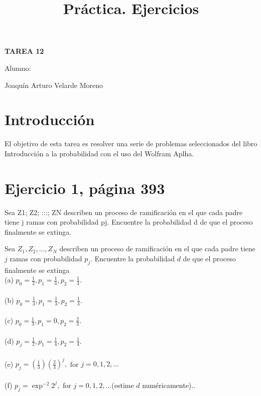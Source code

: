 \documentclass[]{article}
\title{Práctica. Ejercicios}
\date{}
\begin{document}
	\maketitle
	\begin{center}


\centerline{\textbf{TAREA 12} } 
\textbf{ }

\centerline{Alumno: } 
\centerline{Joaquín Arturo Velarde Moreno}


	\end{center}
	

\section{Introducción}

El objetivo de esta tarea es resolver una serie de problemas seleccionados del libro Introducción a la probabilidad\cite{Material} con el uso del Wolfram Aplha\cite{wolf}.

\section{Ejercicio 1, página 393}

Sea Z1; Z2; :::; ZN describen un proceso de ramificación en el que cada padre tiene j ramas con probabilidad pj.
Encuentre la probabilidad d de que el proceso finalmente se extinga.

Sea $Z_{1}, Z_{2}, ..., Z_{N}$ describen un proceso de ramificación en el que cada padre tiene  $j$ ramas con probabilidad $p_{j}$. Encuentre la probabilidad  $d$ de que el proceso finalmente se extinga
\\
(a) $p_{0} = \frac{1}{2}, p_{1} = \frac{1}{4}, p_{2} = \frac{1}{4}$.\\
\\
(b) $p_{0} = \frac{1}{3}, p_{1} = \frac{1}{3}, p_{2} = \frac{1}{3}$.\\
\\
(c) $p_{0} = \frac{1}{3}, p_{1} = 0, p_{2} = \frac{2}{3}$.\\
\\
(d) $p_{j} = \frac{1}{2}, p_{1} = \frac{1}{4}, p_{2} = \frac{1}{4}$.\\
\\
(e) $p_{j} = (\frac{1}{3})(\frac{2}{3})^{j},$ for $j = 0, 1, 2, ...$\\
\\
(f) $p_{j} = \exp^{-2}2^{j},$ for $j = 0, 1, 2, ...$(estime $d$ numéricamente)..\\
\\
\end{document}
